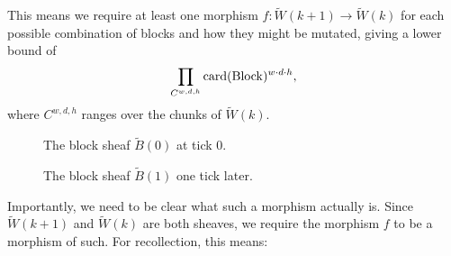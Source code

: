 {\begin{minipage}[t]{0.58\textwidth}
			This means we require at least one morphism
			$f \colon \tilde{W}(k+1) \to \tilde{W}(k)$ for each possible combination
			of blocks and how they might be mutated, giving a lower bound of
			\[
				\prod_{C^{w,d,h}} \operatorname{card}(\mathrm{Block})^{w \cdot d \cdot h},
			\]
			where $C^{w,d,h}$ ranges over the chunks of $\tilde{W}(k)$.
		\end{minipage}%
		\hfill
		\begin{minipage}[t]{0.38\textwidth}
			\vspace{0pt}
			\captionsetup{type=figure}
			\centering
			\begin{subfigure}{\linewidth}
				\centering
				\caption{The block sheaf $\tilde{B}(0)$ at tick $0$.}
				\label{fig:tick-0}
			\end{subfigure}
			\par\medskip
			\begin{subfigure}{\linewidth}
				\centering
				\caption{The block sheaf $\tilde{B}(1)$ one tick later.}
				\label{fig:tick-1}
			\end{subfigure}
			\caption{A block is removed from the chunk $C_{w,0,h}^{w,d,h}$
				between tick $0$ and tick $1$.}
			\label{fig:tick}
		\end{minipage}
		\par\medskip

		Importantly, we need to be clear what such a morphism actually is. Since
		$\tilde{W}(k+1)$ and $\tilde{W}(k)$ are both sheaves, we require the morphism
		$f$ to be a morphism of such. For recollection, this means:

}
